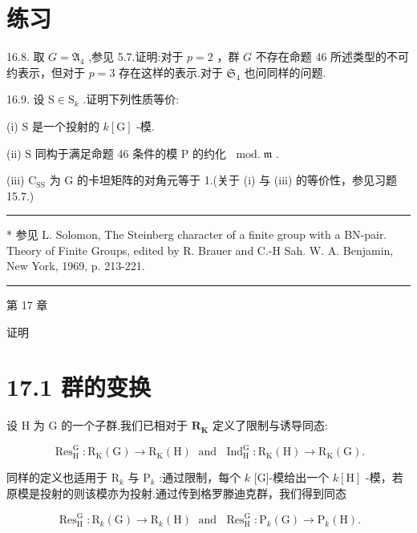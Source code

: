 \documentclass[10pt]{article}
\newcommand{\HRule}{\begin{center}\rule{0.9\linewidth}{0.2mm}\end{center}}
\begin{document}
\section*{练习}

16.8. 取 \(G = {\mathfrak{A}}_{4}\) ,参见 5.7.证明:对于 \(p = 2\) ，群 \(G\) 不存在命题 46 所述类型的不可约表示，但对于 \(p = 3\) 存在这样的表示.对于 \({\mathfrak{S}}_{4}\) 也问同样的问题.

16.9. 设 \(\mathrm{S} \in  {\mathrm{S}}_{k}\) .证明下列性质等价:

(i) \(\mathrm{S}\) 是一个投射的 \(k\left\lbrack  \mathrm{G}\right\rbrack\) -模.

(ii) \(\mathrm{S}\) 同构于满足命题 46 条件的模 \(\mathrm{P}\) 的约化 \({\;\operatorname{mod.}}\mathfrak{m}\) .

(iii) \({\mathrm{C}}_{\mathrm{{SS}}}\) 为 \(\mathrm{G}\) 的卡坦矩阵的对角元等于 1.(关于 (i) 与 (iii) 的等价性，参见习题 15.7.)

\HRule

* 参见 L. Solomon, The Steinberg character of a finite group with a BN-pair. Theory of Finite Groups, edited by R. Brauer and C.-H Sah. W. A. Benjamin, New York, 1969, p. 213-221.

\HRule

第 17 章

证明

\section*{17.1 群的变换}

设 \(\mathrm{H}\) 为 \(\mathrm{G}\) 的一个子群.我们已相对于 \({\mathbf{R}}_{\mathbf{K}}\) 定义了限制与诱导同态:

\[
{\operatorname{Res}}_{\mathrm{H}}^{\mathrm{G}} : {\mathrm{R}}_{\mathrm{K}}\left( \mathrm{G}\right)  \rightarrow  {\mathrm{R}}_{\mathrm{K}}\left( \mathrm{H}\right) \;\text{ and }\;{\operatorname{Ind}}_{\mathrm{H}}^{\mathrm{G}} : {\mathrm{R}}_{\mathrm{K}}\left( \mathrm{H}\right)  \rightarrow  {\mathrm{R}}_{\mathrm{K}}\left( \mathrm{G}\right) .
\]

同样的定义也适用于 \({\mathrm{R}}_{k}\) 与 \({\mathrm{P}}_{k}\) :通过限制，每个 \(k\) [G]-模给出一个 \(k\left\lbrack  \mathrm{H}\right\rbrack\) -模，若原模是投射的则该模亦为投射.通过传到格罗滕迪克群，我们得到同态

\[
{\operatorname{Res}}_{\mathrm{H}}^{\mathrm{G}} : {\mathrm{R}}_{k}\left( \mathrm{G}\right)  \rightarrow  {\mathrm{R}}_{k}\left( \mathrm{H}\right) \;\text{ and }\;{\operatorname{Res}}_{\mathrm{H}}^{\mathrm{G}} : {\mathrm{P}}_{k}\left( \mathrm{G}\right)  \rightarrow  {\mathrm{P}}_{k}\left( \mathrm{H}\right) .
\]
\end{document}
